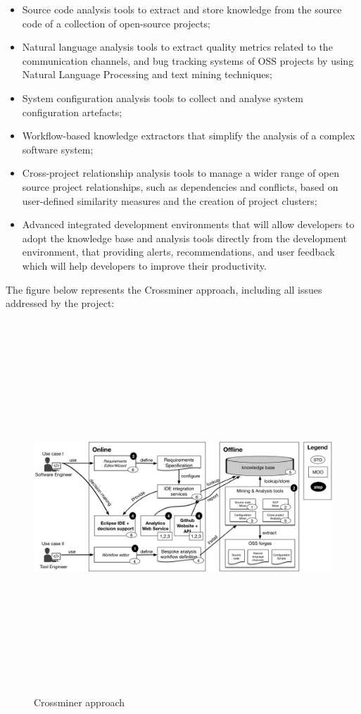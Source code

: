 \begin{itemize}
\item Source code analysis tools to extract and store knowledge from the source code of a collection of open-source projects;
\item Natural language analysis tools to extract quality metrics related to the communication channels, and bug tracking systems of OSS projects by using Natural Language Processing and text mining techniques;
\item System configuration analysis tools to collect and analyse system configuration artefacts;
\item Workflow-based knowledge extractors that simplify the analysis of a complex software system;
\item Cross-project relationship analysis tools to manage a wider range of open source project relationships, such as dependencies and conflicts, based on user-defined similarity measures and the creation of project clusters;
\item Advanced integrated development environments that will allow developers to adopt the  knowledge base and analysis tools directly from the development environment, that providing alerts, recommendations, and user feedback which will help developers to improve their productivity.
\end{itemize}
The figure below represents the Crossminer approach, including all issues addressed by the project:\\


\begin{figure}[H]
\includegraphics[width=14cm,height=14cm,keepaspectratio]{images/crossminer.png}
\centering
\caption{Crossminer approach}
\label{fig:cmd}
\end{figure}

